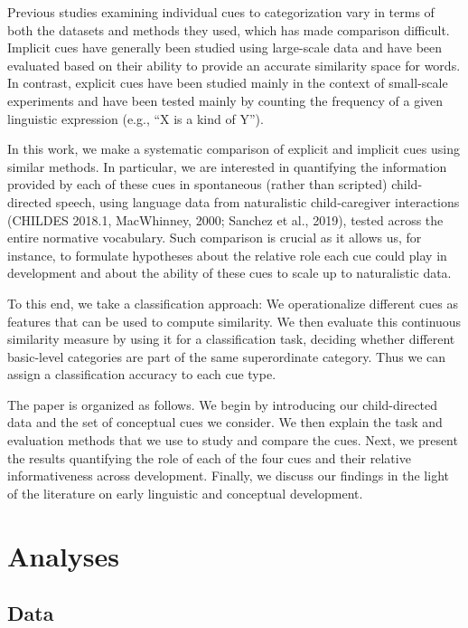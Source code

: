 \documentclass[english,,man,floatsintext]{apa6}
\begin{document}
Previous studies examining individual cues to categorization vary in terms of both the datasets and methods they used, which has made comparison difficult. Implicit cues have
generally been studied using large-scale data and have been evaluated based on their ability to provide an accurate similarity space for words. In contrast, explicit cues have been studied mainly in the context of small-scale experiments and have been tested mainly by counting the frequency of a given linguistic expression (e.g., \enquote{X is a kind of Y}).

In this work, we make a systematic comparison of explicit and implicit cues using similar methods. In particular, we are interested in quantifying the information provided by each of these cues in spontaneous (rather than scripted) child-directed speech, using language data from naturalistic child-caregiver interactions (CHILDES 2018.1, MacWhinney, 2000; Sanchez et al., 2019), tested across the entire normative vocabulary. Such comparison is crucial as it allows us, for instance, to formulate hypotheses about the relative role each cue could play in development and about the ability of these cues to scale up to naturalistic data.

To this end, we take a classification approach: We operationalize different cues as features that can be used to compute similarity. We then evaluate this continuous similarity measure by using it for a classification task, deciding whether different basic-level categories are part of the same superordinate category. Thus we can assign a classification accuracy to each cue type.

The paper is organized as follows. We begin by introducing our child-directed data and the set of conceptual cues we consider. We then explain the task and evaluation methods that we use to study and compare the cues. Next, we present the results quantifying the role of each of the four cues and their relative informativeness across development. Finally, we discuss our findings in the light of the literature on early linguistic and conceptual development.

\hypertarget{analyses}{%
\section{Analyses}\label{analyses}}

\hypertarget{data}{%
\subsection{Data}\label{data}}
\end{document}
